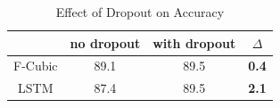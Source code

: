 
\begin{table}[h]
\centering
\begin{tabular}{|c|c|c|c|}
\hline
{\bf } & no dropout & with dropout & {\bf $\Delta$} \\ \hline
F-Cubic    & 89.1        & 89.5        & {\bf 0.4} \\ \hline
LSTM       & 87.4        & 89.5  & {\bf 2.1} \\ \hline
\end{tabular}
\caption{\label{table:with_without_dropout} Effect of Dropout on Accuracy}
\end{table}





